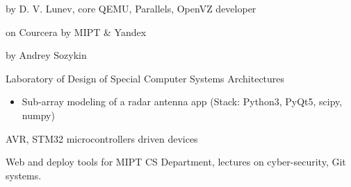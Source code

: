 \documentclass[10pt,a4paper]{cv}
\begin{document}



by D. V. Lunev, core QEMU, Parallels, OpenVZ developer

on Courcera by MIPT \& Yandex

by Andrey Sozykin

Laboratory of Design of Special Computer Systems Architectures
\begin{itemize}
\item Sub-array modeling of a radar antenna app (Stack: Python3, PyQt5, scipy, numpy)
\end{itemize}

AVR, STM32 microcontrollers driven devices

Web and deploy tools for MIPT CS Department, lectures on cyber-security, Git systems.
\clearpage
\end{document}
